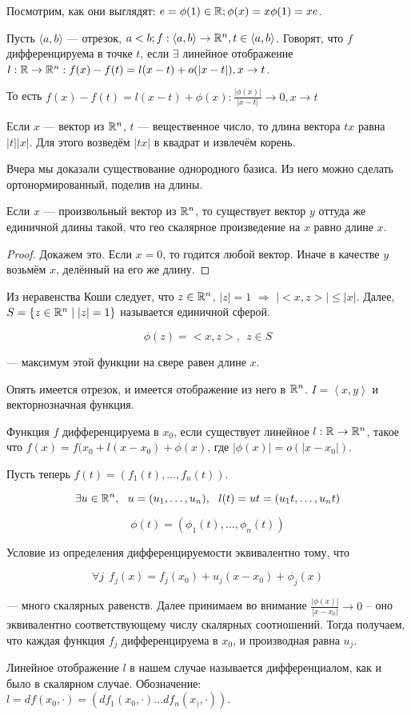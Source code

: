\documentclass[12pt]{report}
\begin{document}
Посмотрим, как они выглядят: $e = \phi(1) \in \mathbb{R}; \phi(x) = x \phi(1) = xe$.

Пусть $\langle a, b\rangle$ --- отрезок, $a < b; f: \langle a, b\rangle \to \mathbb{R}^n, t \in \langle a, b\rangle$. Говорят, что $f$ дифференцируема в точке $t$, если $\exists$ линейное отображение $l: \mathbb{R} \to \mathbb{R}^n: f(x) - f(t) = l(x - t) + o(|x - t|), x \to t$.

То есть $f(x) - f(t) = l(x - t) + \phi(x): \frac{|\phi(x)|}{|x - t|} \to 0, x \to t$

\begin{rem}
Если $x$ --- вектор из $\mathbb{R}^n$, $t$ --- вещественное число, то длина вектора $tx$ равна $|t||x|$. Для этого возведём $|tx|$ в квадрат и извлечём корень.

Вчера мы доказали существование однородного базиса. Из него можно сделать ортонормированный, поделив на длины.

\begin{lm}
Если $x$ --- произвольный вектор из $\mathbb{R}^n$, то существует вектор $y$ оттуда же единичной длины такой, что гео скалярное произведение на $x$ равно длине $x$.
\end{lm}
\begin{proof}
Докажем это. Если $x=0$, то годится любой вектор. Иначе в качестве $y$ возьмём $x$, делённый на его же длину.
\end{proof}

Из неравенства Коши следует, что $z \in \mathbb{R}^n$, $|z|=1$ $\Rightarrow$ $|<x,z>| \le |x|$. Далее, $S = \{z \in \mathbb{R}^n \mid |z|=1\}$ называется единичной сферой.

$$\phi(z) = <x,z>,\ \ z \in S$$

--- максимум этой функции на свере равен длине $x$.
\end{rem}

\begin{defn}
Опять имеется отрезок, и имеется отображение из него в $\mathbb{R}^n$. $I = \left< x,y \right>$ и векторнозначная функция.

Функция $f$ дифференцируема в $x_0$, если существует линейное $l : \mathbb{R} \to \mathbb{R}^n$, такое что $f(x) = f(x_0 + l(x-x_0) + \phi(x)$, где $|\phi(x)| = o(|x-x_0|)$.

Пусть теперь $f(t) = (f_1(t),\ldots,f_n(t))$.

$$\exists u \in \R^n,\ \ u=(u_1,\ldots,u_n),\ \ l(t) = ut = (u_1t,\ldots,u_nt)$$

$$\phi(t) = (\phi_1(t),\ldots,\phi_n(t))$$

Условие из определения дифференцируемости эквивалентно тому, что

$$\forall j\ \  f_j(x) = f_j(x_0) + u_j(x-x_0) + \phi_j(x)$$

 --- много скалярных равенств. Далее принимаем во внимание $\frac{|\phi(x)|}{|x-x_0|} \to 0$ -- оно эквивалентно соответствующему числу скалярных соотношений. Тогда получаем, что каждая функция $f_j$ дифференцируема в $x_0$, и производная равна $u_j$.

Линейное отображение $l$ в нашем случае называется дифференциалом, как и было в скалярном случае. Обозначение: $l = df(x_0,\cdot) = (df_1(x_0,\cdot)\ldots df_n(x_),\cdot))$.
\end{defn}
\end{document}
